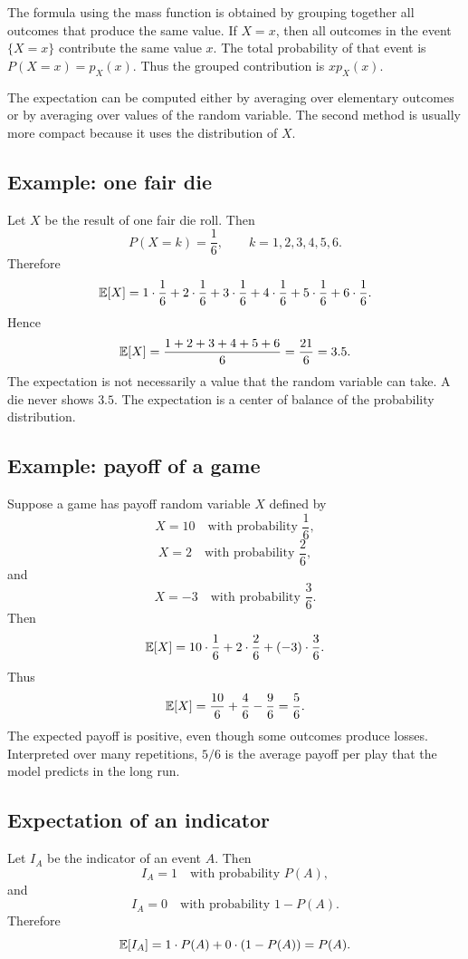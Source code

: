 The formula using the mass function is obtained by grouping together all
outcomes that produce the same value. If \(X=x\), then all outcomes in the event
\(\{X=x\}\) contribute the same value \(x\). The total probability of that event
is \(P(X=x)=p_X(x)\). Thus the grouped contribution is \(x p_X(x)\).

\begin{remarkbox}
The expectation can be computed either by averaging over elementary outcomes or
by averaging over values of the random variable. The second method is usually
more compact because it uses the distribution of \(X\).
\end{remarkbox}

\subsection*{Example: one fair die}

Let \(X\) be the result of one fair die roll. Then
\[
P(X=k)=\frac16,\qquad k=1,2,3,4,5,6.
\]
Therefore
\[
\mathbb{E}[X]=1\cdot\frac16+2\cdot\frac16+3\cdot\frac16+4\cdot\frac16+5\cdot\frac16+6\cdot\frac16.
\]
Hence
\[
\mathbb{E}[X]=\frac{1+2+3+4+5+6}{6}=\frac{21}{6}=3.5.
\]
The expectation is not necessarily a value that the random variable can take.
A die never shows \(3.5\). The expectation is a center of balance of the
probability distribution.

\subsection*{Example: payoff of a game}

Suppose a game has payoff random variable \(X\) defined by
\[
X=10 \quad\text{with probability }\frac16,
\]
\[
X=2 \quad\text{with probability }\frac26,
\]
and
\[
X=-3 \quad\text{with probability }\frac36.
\]
Then
\[
\mathbb{E}[X]=10\cdot\frac16+2\cdot\frac26+(-3)\cdot\frac36.
\]
Thus
\[
\mathbb{E}[X]=\frac{10}{6}+\frac{4}{6}-\frac{9}{6}=\frac56.
\]
The expected payoff is positive, even though some outcomes produce losses.
Interpreted over many repetitions, \(5/6\) is the average payoff per play that
the model predicts in the long run.

\subsection*{Expectation of an indicator}

Let \(I_A\) be the indicator of an event \(A\). Then
\[
I_A=1 \quad\text{with probability }P(A),
\]
and
\[
I_A=0 \quad\text{with probability }1-P(A).
\]
Therefore
\[
\mathbb{E}[I_A]=1\cdot P(A)+0\cdot(1-P(A))=P(A).
\]

